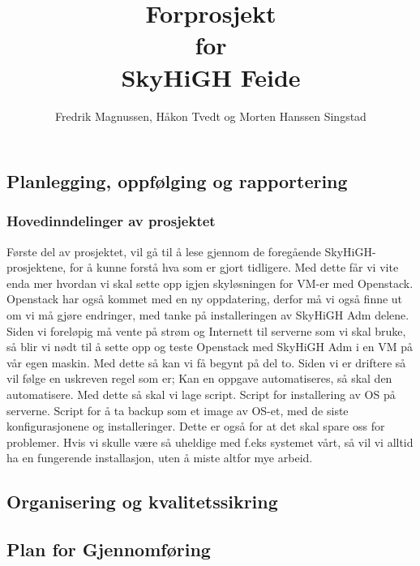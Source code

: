 \documentclass[12pt,a4paper]{article}
\begin{document}
\title{Forprosjekt \\ for \\ SkyHiGH Feide}
\author{Fredrik Magnussen, Håkon Tvedt og Morten Hanssen Singstad}
\maketitle

\newpage
\tableofcontents

\newpage
\subsection{Planlegging, oppfølging og rapportering}
\subsubsection{Hovedinndelinger av prosjektet}
Første del av prosjektet, vil gå til å lese gjennom de foregående SkyHiGH-prosjektene, for å kunne forstå hva som er 
gjort tidligere. Med dette får vi vite enda mer hvordan vi skal sette opp igjen skyløsningen for VM-er med Openstack.
Openstack har også kommet med en ny oppdatering, derfor må vi også finne ut om vi må gjøre endringer, med tanke på installeringen 
av SkyHiGH Adm delene. Siden vi foreløpig må vente på strøm og Internett til serverne som vi skal bruke, så blir vi nødt til å 
sette opp og teste Openstack med SkyHiGH Adm i en VM på vår egen maskin. \newline \newline
Med dette så kan vi få begynt på del to. Siden vi er driftere så vil følge en uskreven regel som er; Kan en oppgave automatiseres, så skal den automatisere.
Med dette så skal vi lage script. Script for installering av OS på serverne. Script for å ta backup som et image av OS-et, med de siste konfigurasjonene og installeringer.
Dette er også for at det skal spare oss for problemer. Hvis vi skulle være så uheldige med f.eks systemet vårt, så vil vi alltid ha en fungerende installasjon, uten å miste
altfor mye arbeid. 

\subsection{Organisering og kvalitetssikring}

\subsection{Plan for Gjennomføring}
\end{document}
